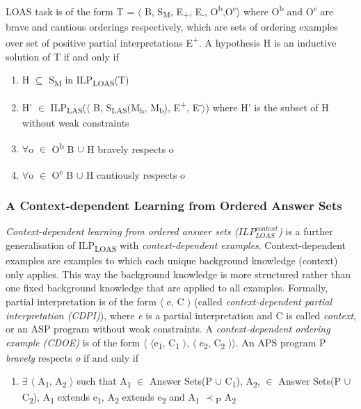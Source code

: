 \documentclass[12pt,twoside]{report}
\begin{document}
LOAS task is of the form T = $\langle$ B, S\textsubscript{M}, E\textsubscript{+}, E\textsubscript{-}, O\textsuperscript{b},O\textsuperscript{c}$\rangle$ where O\textsuperscript{b} and O\textsuperscript{c} are brave and cautious orderings respectively, which are sets of ordering examples over set of positive partial interpretations E\textsuperscript{+}.
A hypothesis H is an inductive solution of T if and only if 
\begin{enumerate}
\item H $\subseteq$ S\textsubscript{M} in ILP\textsubscript{LOAS}(T)
\item H' $\in$ ILP\textsubscript{LAS}($\langle$ B, S\textsubscript{LAS}(M\textsubscript{h}, M\textsubscript{b}), E\textsuperscript{+}, E\textsuperscript{-}$\rangle$) where H' is the subset of H without weak constraints
\item $\forall$o $\in$ O\textsuperscript{b} B $\cup$ H bravely respects o
\item $\forall$o $\in$ O\textsuperscript{c} B $\cup$ H cautiously respects o
\end{enumerate}

\subsubsection{A Context-dependent Learning from Ordered Answer Sets }
\textit{Context-dependent learning from ordered answer sets ($ILP_{LOAS}^{context}$)} is a further generalisation of ILP\textsubscript{LOAS} with \textit{context-dependent examples}. 
Context-dependent examples are examples to which each unique background knowledge (context) only applies. This way the background knowledge is more structured rather than one fixed background knowledge that are applied to all examples. 
Formally, partial interpretation is of the form $\langle$ e, C $\rangle$ (called \textit{context-dependent partial interpretation (CDPI)}), where \textit{e} is a partial interpretation and C is called \textit{context}, or an ASP program without weak constraints.
A \textit{context-dependent ordering example (CDOE)} is of the form $\langle$ $\langle$e\textsubscript{1}, C\textsubscript{1} $\rangle$, $\langle$ e\textsubscript{2}, C\textsubscript{2} $\rangle$$\rangle$. An APS program P \textit{bravely} respects \textit{o} if and only if 
\begin{enumerate}
 \item $\exists$ $\langle$ A\textsubscript{1}, A\textsubscript{2} $\rangle$ such that A\textsubscript{1} $\in$ Answer Sets(P $\cup$ C\textsubscript{1}),  A\textsubscript{2}, $\in$ Answer Sets(P $\cup$ C\textsubscript{2}), A\textsubscript{1} extends e\textsubscript{1}, A\textsubscript{2} extends e\textsubscript{2} and A\textsubscript{1} $\prec$\textsubscript{P} A\textsubscript{2}
\end{enumerate}
\end{document}
